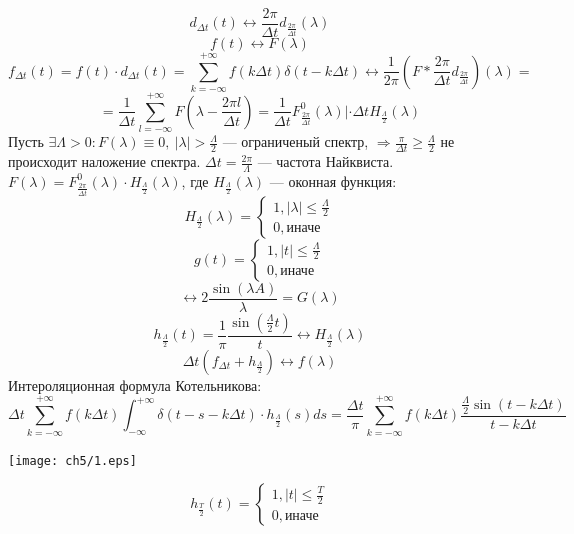 \[d_{\Delta t}(t) \leftrightarrow \frac{2\pi}{\Delta t}d_{\frac{2\pi}{\Delta t}}(\lambda)\]
\[f(t) \leftrightarrow F(\lambda)\]
\[f_{\Delta t}(t) = f(t)\cdot d_{\Delta t}(t) = \sum_{k = -\infty}^{+\infty} f(k\Delta t)\delta(t - k\Delta t) \leftrightarrow \frac{1}{2\pi}(F*\frac{2\pi}{\Delta t}d_{\frac{2\pi}{\Delta t}})(\lambda) =\]
\[= \frac{1}{\Delta t} \sum_{l = -\infty}^{+\infty} F(\lambda - \frac{2\pi l}{\Delta t}) = \frac{1}{\Delta t}F_{\frac{2\pi}{\Delta t}}^0(\lambda)|\cdot\Delta t H_{\frac{\Lambda}{2}}(\lambda)\]
Пусть $\exists \Lambda > 0 : F(\lambda) \equiv 0, \: |\lambda| > \frac{\Lambda}{2}$ --- ограниченый спектр, $\Rightarrow \frac{\pi}{\Delta t} \geq \frac{\Lambda}{2}$ не происходит наложение спектра.
$\Delta t = \frac{2\pi}{\Lambda}$ --- частота Найквиста.\\
\(F(\lambda) = F_{\frac{2\pi}{\Delta t}}^0(\lambda)\cdot H_{\frac{\Lambda}{2}}(\lambda)\), где $H_{\frac{\Lambda}{2}}(\lambda)$ --- оконная функция:
\begin{equation*}
H_{\frac{\Lambda}{2}}(\lambda) = 
 \begin{cases}
   1, |\lambda| \leq \frac{\Lambda}{2}\\
   0, \texttt{иначе}
 \end{cases}
\end{equation*}
\begin{equation*}
g(t) = 
 \begin{cases}
   1, |t| \leq \frac{\Lambda}{2}\\
   0, \texttt{иначе}
 \end{cases}
\end{equation*}
\[\leftrightarrow 2\frac{\sin(\lambda A)}{\lambda} = G(\lambda)\]
\[h_{\frac{\Lambda}{2}}(t) = \frac{1}{\pi}\frac{\sin(\frac{\Lambda}{2}t)}{t} \leftrightarrow H_{\frac{\Lambda}{2}}(\lambda)\]
\[\Delta t(f_{\Delta t} + h_{\frac{\Lambda}{2}}) \leftrightarrow f(\lambda)\]
Интероляционная формула Котельникова:
\[\Delta t \sum_{k = -\infty}^{+\infty} f(k\Delta t)\int_{-\infty}^{+\infty}\delta(t - s - k\Delta t)\cdot h_{\frac{\Lambda}{2}}(s)ds = \frac{\Delta t}{\pi} \sum_{k = -\infty}^{+\infty} f(k\Delta t)\frac{\frac{\Lambda}{2}\sin(t - k\Delta t)}{t - k\Delta t}\]
\begin{center}
        \texttt{[image: ch5/1.eps]}
\end{center}
\begin{equation*}
h_{\frac{T}{2}}(t) = 
 \begin{cases}
   1, |t| \leq \frac{T}{2}\\
   0, \texttt{иначе}
 \end{cases}
\end{equation*}
